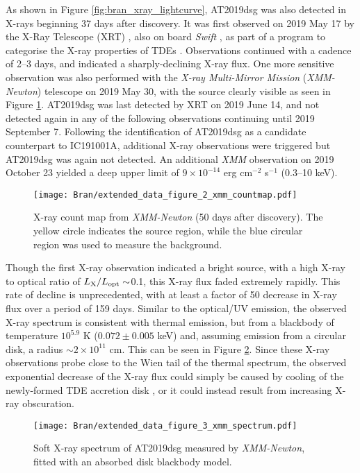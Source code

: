 As shown in Figure \ref{fig:bran_xray_lightcurve}, AT2019dsg was also detected in X-rays beginning 37 days after discovery. It was first observed on 2019 May 17 by the X-Ray Telescope (XRT) , also on board \textit{Swift} , as part of a program to categorise the X-ray properties of TDEs \cite{van_velzen_20}. Observations continued with a cadence of 2--3 days, and indicated a sharply-declining X-ray flux. One more sensitive observation was also performed with the \textit{X-ray Multi-Mirror Mission} (\textit{XMM-Newton}) telescope  on 2019 May 30, with the source clearly visible as seen in Figure \ref{fig:xraymap}. AT2019dsg was last detected by XRT on 2019 June 14, and not detected again in any of the following observations continuing until 2019 September 7. Following the identification of AT2019dsg as a candidate counterpart to IC191001A, additional X-ray observations were triggered but AT2019dsg was again not detected. An additional \textit{XMM} observation on 2019 October 23 yielded a deep upper limit of $9 \times 10^{-14}$ erg cm$^{-2}$ s$^{-1}$ (0.3--10 keV). 

\begin{figure}[!ht]
	\texttt{[image: Bran/extended\_data\_figure\_2\_xmm\_countmap.pdf]}
	\caption{X-ray count map from \textit{XMM-Newton} (50 days after discovery). The yellow circle indicates the source region, while the blue circular region was used to measure the background.}
	\label{fig:xraymap}
\end{figure}

Though the first X-ray observation indicated a bright source, with a high X-ray to optical ratio of $L_{\textup{X}}/L_{\textup{opt}} \sim $0.1, this X-ray flux faded extremely rapidly. This rate of decline is unprecedented, with at least a factor of 50 decrease in X-ray flux over a period of 159 days. Similar to the optical/UV emission, the observed X-ray spectrum is consistent with thermal emission, but from a blackbody of temperature $10^{5.9}$ K ($0.072 \pm 0.005$ keV) and, assuming emission from a circular disk, a radius $\sim 2 \times 10^{11}$ cm. This can be seen in Figure \ref{fig:xrayspec}. Since these X-ray observations probe close to the Wien tail of the thermal spectrum, the observed exponential decrease of the X-ray flux could simply be caused by cooling of the newly-formed TDE accretion disk  , or it could instead result from increasing X-ray obscuration.

\begin{figure}[!ht]
	\texttt{[image: Bran/extended\_data\_figure\_3\_xmm\_spectrum.pdf]}
	\caption{Soft X-ray spectrum of AT2019dsg measured by \textit{XMM-Newton}, fitted with an absorbed disk blackbody model.}
	\label{fig:xrayspec}
\end{figure}

